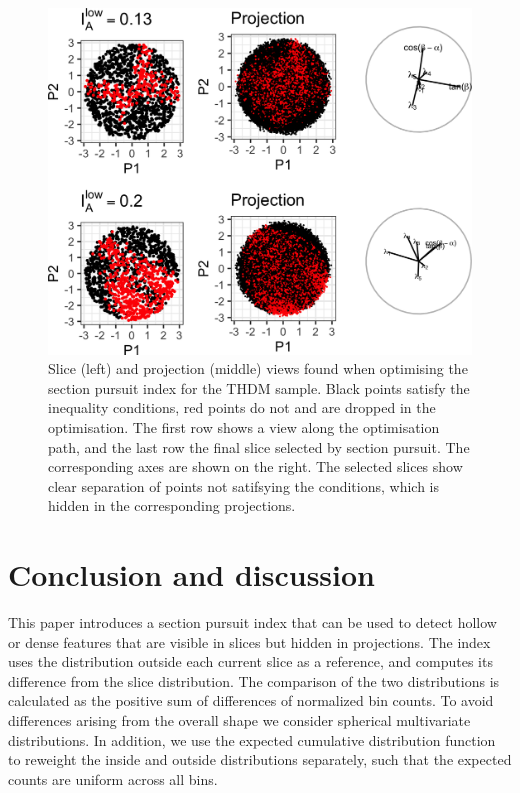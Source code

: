 \documentclass[]{interact}
\theoremstyle{plain}%
\theoremstyle{definition}
\theoremstyle{remark}
\begin{document}
\begin{figure}
\includegraphics[width=1\linewidth]{section_pursuit_files/figure-latex/thdm-1} \caption{Slice (left) and projection (middle) views found when optimising the section pursuit index for the THDM sample. Black points satisfy the inequality conditions, red points do not and are dropped in the optimisation. The first row shows a view along the optimisation path, and the last row the final slice selected by section pursuit. The corresponding axes are shown on the right. The selected slices show clear separation of points not satifsying the conditions, which is hidden in the corresponding projections.}\label{fig:thdm}
\end{figure}

\hypertarget{conclusion-and-discussion}{%
\section{Conclusion and discussion}\label{conclusion-and-discussion}}

This paper introduces a section pursuit index that can be used to detect
hollow or dense features that are visible in slices but hidden in
projections. The index uses the distribution outside each current slice
as a reference, and computes its difference from the slice distribution.
The comparison of the two distributions is calculated as the positive
sum of differences of normalized bin counts. To avoid differences
arising from the overall shape we consider spherical multivariate
distributions. In addition, we use the expected cumulative distribution
function to reweight the inside and outside distributions separately,
such that the expected counts are uniform across all bins.
\end{document}
